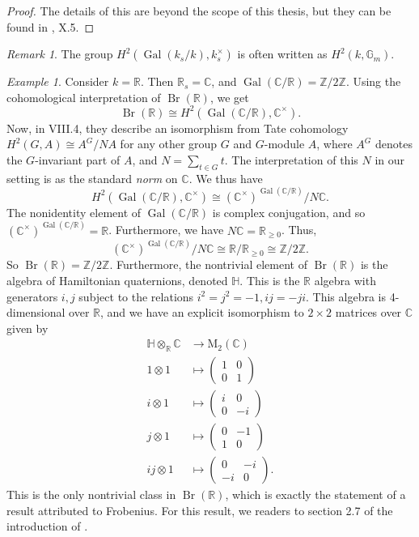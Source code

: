 \documentclass[12pt,twoside]{reedthesis}
\theoremstyle{plain}
\theoremstyle{definition}
\theoremstyle{remark}
\newtheorem{remark}{Remark}[section]
\newtheorem{example}{Example}[section]
\newcommand{\ZZ}{\mathbb{Z}}
\newcommand{\RR}{\mathbb{R}}
\newcommand{\CC}{\mathbb{C}}
\newcommand{\Br}{\operatorname{Br}}
\newcommand{\Gal}{\operatorname{Gal}}
\begin{document}
\begin{proof}
The details of this are beyond the scope of this thesis, but they can be found in \cite{serreLF}, X.5.
\end{proof}
\begin{remark} 
The group $H^2(\Gal(k_s/k),k_s^\times)$ is often written as $H^2(k,\mathbb{G}_m)$.
\end{remark}
\begin{example}
Consider $k=\RR$. Then $\RR_s=\CC$, and $\Gal(\CC/\RR)=\ZZ/2\ZZ$. Using the cohomological interpretation of $\Br(\RR)$, we get
\[
\Br(\RR)\cong H^2(\Gal(\CC/\RR),\CC^\times).
\]
Now, in \cite{serreLF} VIII.4, they describe an isomorphism from Tate cohomology $H^2(G,A)\cong A^G/NA$ for any other group $G$ and $G$-module $A$, where $A^G$ denotes the $G$-invariant part of $A$, and $N=\sum_{t\in G}t.$ The interpretation of this $N$ in our setting is as the standard \emph{norm} on $\CC$. We thus have
\[
H^2(\Gal(\CC/\RR),\CC^\times)\cong (\CC^\times)^{\Gal(\CC/\RR)}/N\CC.
\]
The nonidentity element of $\Gal(\CC/\RR)$ is complex conjugation, and so $(\CC^\times)^{\Gal(\CC/\RR)}=\RR$. Furthermore, we have $N\CC=\RR_{\geq0}$. Thus,
\[
(\CC^\times)^{\Gal(\CC/\RR)}/N\CC\cong\RR/\RR_{\geq0}\cong\ZZ/2\ZZ.
\]
So $\Br(\RR)=\ZZ/2\ZZ$. Furthermore, the nontrivial element of $\Br(\RR)$ is the algebra of Hamiltonian quaternions, denoted $\mathbb{H}$. This is the $\RR$ algebra with generators $i,j$ subject to the relations $i^2=j^2=-1, ij=-ji$. This algebra is 4-dimensional over $\RR$, and we have an explicit isomorphism to $2\times2$ matrices over $\CC$ given by
\begin{align*}
\mathbb{H}\otimes_\RR\CC&\longrightarrow\text{M}_2(\CC)\\
1\otimes 1&\longmapsto\begin{pmatrix}1&0\\0&1\end{pmatrix}\\
i\otimes 1&\longmapsto\begin{pmatrix}i&0\\0&-i\end{pmatrix}\\
j\otimes 1&\longmapsto\begin{pmatrix}0&-1\\1&0\end{pmatrix}\\
ij\otimes 1&\longmapsto\begin{pmatrix}0&-i\\-i&0\end{pmatrix}.
\end{align*}
This is the only nontrivial class in $\Br(\RR)$, which is exactly the statement of a result attributed to Frobenius. For this result, we readers to section 2.7 of the introduction of \cite{bahturin}.
\end{example}
\end{document}
